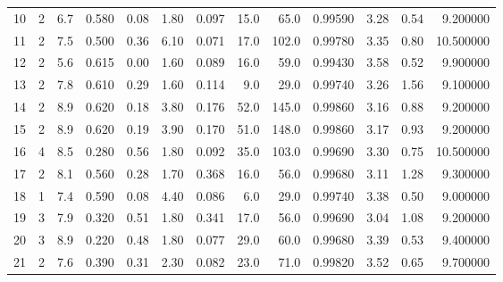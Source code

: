 \begin{tabular}{lrrrrrrrrrrrr}
10   &        2 &            6.7 &             0.580 &         0.08 &            1.80 &      0.097 &                 15.0 &                  65.0 &  0.99590 &  3.28 &       0.54 &   9.200000 \\
11   &        2 &            7.5 &             0.500 &         0.36 &            6.10 &      0.071 &                 17.0 &                 102.0 &  0.99780 &  3.35 &       0.80 &  10.500000 \\
12   &        2 &            5.6 &             0.615 &         0.00 &            1.60 &      0.089 &                 16.0 &                  59.0 &  0.99430 &  3.58 &       0.52 &   9.900000 \\
13   &        2 &            7.8 &             0.610 &         0.29 &            1.60 &      0.114 &                  9.0 &                  29.0 &  0.99740 &  3.26 &       1.56 &   9.100000 \\
14   &        2 &            8.9 &             0.620 &         0.18 &            3.80 &      0.176 &                 52.0 &                 145.0 &  0.99860 &  3.16 &       0.88 &   9.200000 \\
15   &        2 &            8.9 &             0.620 &         0.19 &            3.90 &      0.170 &                 51.0 &                 148.0 &  0.99860 &  3.17 &       0.93 &   9.200000 \\
16   &        4 &            8.5 &             0.280 &         0.56 &            1.80 &      0.092 &                 35.0 &                 103.0 &  0.99690 &  3.30 &       0.75 &  10.500000 \\
17   &        2 &            8.1 &             0.560 &         0.28 &            1.70 &      0.368 &                 16.0 &                  56.0 &  0.99680 &  3.11 &       1.28 &   9.300000 \\
18   &        1 &            7.4 &             0.590 &         0.08 &            4.40 &      0.086 &                  6.0 &                  29.0 &  0.99740 &  3.38 &       0.50 &   9.000000 \\
19   &        3 &            7.9 &             0.320 &         0.51 &            1.80 &      0.341 &                 17.0 &                  56.0 &  0.99690 &  3.04 &       1.08 &   9.200000 \\
20   &        3 &            8.9 &             0.220 &         0.48 &            1.80 &      0.077 &                 29.0 &                  60.0 &  0.99680 &  3.39 &       0.53 &   9.400000 \\
21   &        2 &            7.6 &             0.390 &         0.31 &            2.30 &      0.082 &                 23.0 &                  71.0 &  0.99820 &  3.52 &       0.65 &   9.700000 \\

\end{tabular}
